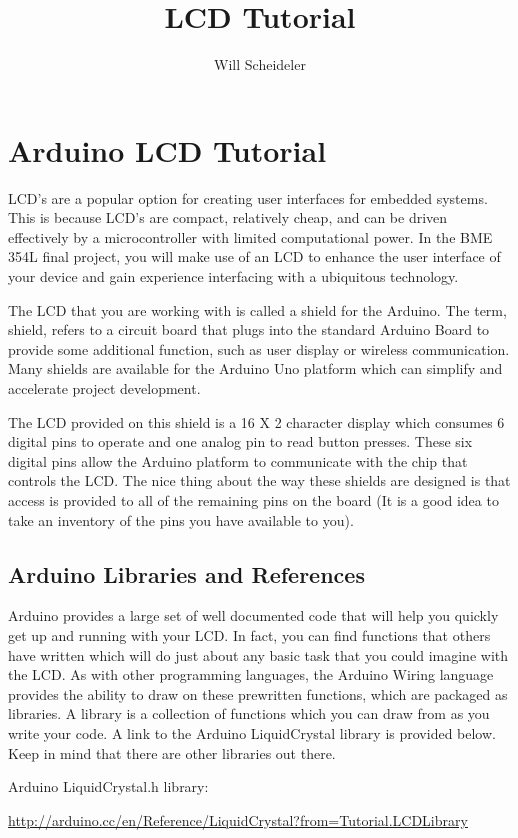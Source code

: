 \documentclass[10pt]{report}
\title{LCD Tutorial}
\author{Will Scheideler}
\begin{document}
\section*{Arduino LCD Tutorial}
 
\par 
LCD’s are a popular option for creating user interfaces for embedded systems. This is because LCD’s are compact, relatively cheap, and can be driven effectively by a microcontroller with limited computational power. In the BME 354L final project, you will make use of an LCD to enhance the user interface of your device and gain experience interfacing with a ubiquitous technology.
\par
The LCD that you are working with is called a shield for the Arduino. The term, shield, refers to a circuit board that plugs into the standard Arduino Board to provide some additional function, such as user display or wireless communication. Many shields are available for the Arduino Uno platform which can simplify and accelerate project development.
\par
	The LCD provided on this shield is a 16 X 2 character display which consumes 6 digital pins to operate and one analog pin to read button presses. These six digital pins allow the Arduino platform to communicate with the chip that controls the LCD. The nice thing about the way these shields are designed is that access is provided to all of the remaining pins on the board (It is a good idea to take an inventory of the pins you have available to you).

\subsection*{Arduino Libraries and References}
Arduino provides a large set of well documented code that will help you quickly get up and running with your LCD. In fact, you can find functions that others have written which will do just about any basic task that you could imagine with the LCD. As with other programming languages, the Arduino Wiring language provides the ability to draw on these prewritten functions, which are packaged as libraries. A library is a collection of functions which you can draw from as you write your code. A link to the Arduino LiquidCrystal library is provided below. Keep in mind that there are other libraries out there. 

Arduino LiquidCrystal.h library:
\par
\url{http://arduino.cc/en/Reference/LiquidCrystal?from=Tutorial.LCDLibrary}
\end{document}
